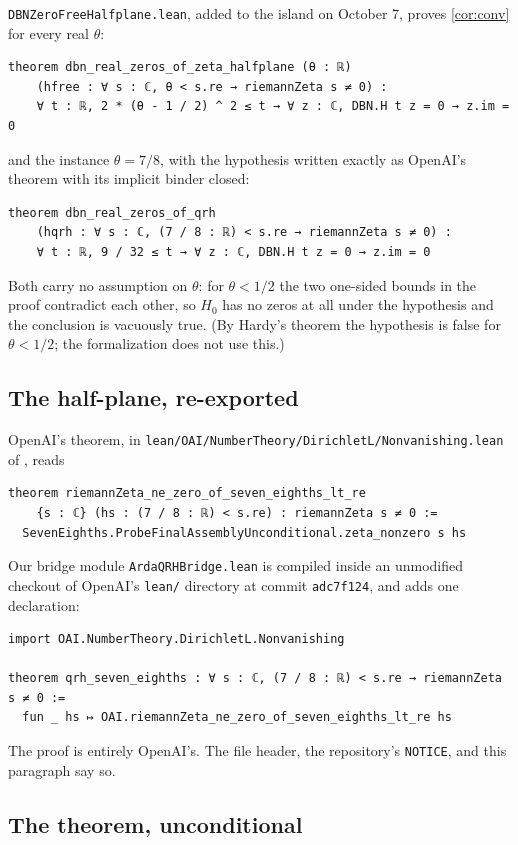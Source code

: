 \documentclass[11pt]{article}
\theoremstyle{definition}
\newcommand{\lean}[1]{\texttt{#1}}
\newcommand{\Hfun}{H}
\begin{document}
\lean{DBNZeroFreeHalfplane.lean}, added to the island on October 7, proves \cref{cor:conv} for every real $\theta$:
\begin{lstlisting}
theorem dbn_real_zeros_of_zeta_halfplane (θ : ℝ)
    (hfree : ∀ s : ℂ, θ < s.re → riemannZeta s ≠ 0) :
    ∀ t : ℝ, 2 * (θ - 1 / 2) ^ 2 ≤ t → ∀ z : ℂ, DBN.H t z = 0 → z.im = 0
\end{lstlisting}
and the instance $\theta = 7/8$, with the hypothesis written exactly as OpenAI's theorem with its implicit binder closed:
\begin{lstlisting}
theorem dbn_real_zeros_of_qrh
    (hqrh : ∀ s : ℂ, (7 / 8 : ℝ) < s.re → riemannZeta s ≠ 0) :
    ∀ t : ℝ, 9 / 32 ≤ t → ∀ z : ℂ, DBN.H t z = 0 → z.im = 0
\end{lstlisting}
Both carry no assumption on $\theta$: for $\theta < 1/2$ the two one-sided bounds in the proof contradict each other, so $\Hfun_0$ has no zeros at all under the hypothesis and the conclusion is vacuously true. (By Hardy's theorem the hypothesis is false for $\theta < 1/2$; the formalization does not use this.)

\subsection{The half-plane, re-exported}

OpenAI's theorem, in \lean{lean/OAI/NumberTheory/DirichletL/Nonvanishing.lean} of \cite{OAImath}, reads
\begin{lstlisting}
theorem riemannZeta_ne_zero_of_seven_eighths_lt_re
    {s : ℂ} (hs : (7 / 8 : ℝ) < s.re) : riemannZeta s ≠ 0 :=
  SevenEighths.ProbeFinalAssemblyUnconditional.zeta_nonzero s hs
\end{lstlisting}
Our bridge module \lean{ArdaQRHBridge.lean} is compiled inside an unmodified checkout of OpenAI's \lean{lean/} directory at commit \lean{adc7f124}, and adds one declaration:
\begin{lstlisting}
import OAI.NumberTheory.DirichletL.Nonvanishing

theorem qrh_seven_eighths : ∀ s : ℂ, (7 / 8 : ℝ) < s.re → riemannZeta s ≠ 0 :=
  fun _ hs ↦ OAI.riemannZeta_ne_zero_of_seven_eighths_lt_re hs
\end{lstlisting}
The proof is entirely OpenAI's. The file header, the repository's \lean{NOTICE}, and this paragraph say so.

\subsection{The theorem, unconditional}
\end{document}
